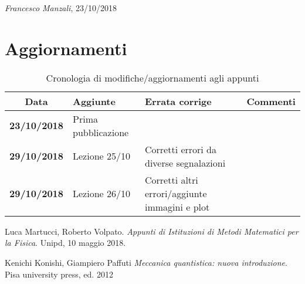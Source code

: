 \documentclass[12pt]{report}
\begin{document}
\begin{flushright}
\textit{Francesco Manzali}, 23/10/2018
\end{flushright}
\section*{Aggiornamenti}
\begin{table}[hb]
    \centering
    \begin{tabular}{|cm{3cm}m{5cm}m{3cm}|}\toprule
        Data & Aggiunte & Errata corrige & Commenti\\\midrule
        \textbf{23/10/2018} & Prima pubblicazione & & \\
        \textbf{29/10/2018} & Lezione 25/10 & Corretti errori da diverse segnalazioni & \\
        \textbf{29/10/2018} & Lezione 26/10 & Corretti altri errori/aggiunte immagini e plot & \\
        \bottomrule
    \end{tabular}
    \caption{Cronologia di modifiche/aggiornamenti agli appunti}
    \label{updates}
\end{table}

\clearpage





\clearpage
\begin{thebibliography}{9}

Luca Martucci, Roberto Volpato.
\textit{Appunti di Istituzioni di Metodi Matematici per la Fisica}. 
Unipd, 10 maggio 2018.
 
Kenichi Konishi, Giampiero Paffuti
\textit{Meccanica quantistica: nuova introduzione}.
Pisa university press, ed. 2012
\end{thebibliography}

\printindex
\end{document}
